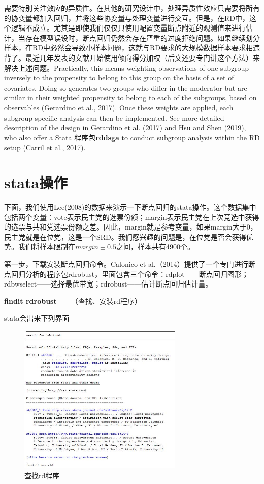 \documentclass[cn,12pt,math=newtx,citestyle=gb7714-2015,bibstyle=gb7714-2015]{elegantbook}
\begin{document}
	需要特别关注效应的异质性。在其他的研究设计中，处理异质性效应只需要将所有的协变量都加入回归，并将这些协变量与处理变量进行交互。但是，在RD中，这个逻辑不成立。尤其是即使我们仅仅只使用配置变量断点附近的观测值来进行估计，当存在模型误设时，断点回归仍然会存在严重的过度拒绝问题。如果继续划分样本，在RD中必然会导致小样本问题，这就与RD要求的大规模数据样本要求相违背了。最近几年发表的文献开始使用倾向得分加权（后文还要专门讲这个方法）来解决上述问题。Practically, this means weighting observations of one subgroup inversely to the propensity to belong to this group on the basis of a set of covariates. Doing so generates two groups who differ in the moderator but are similar in their weighted propensity to belong to each of the subgroups, based on observables (Gerardino et al., 2017). Once these weights are applied, each subgroup-specific analysis can then be implemented. See more detailed description of the design in Gerardino et al. (2017) and Hsu and Shen (2019), who also offer a Stata 程序包\textbf{rddsga} to conduct subgroup analysis within the RD setup (Carril et al., 2017).
	
	

	
	\section{stata操作}
	
	下面，我们使用Lee(2008)的数据来演示一下断点回归的stata操作。这个数据集中包括两个变量：vote表示民主党的选票份额；margin表示民主党在上次竞选中获得的选票与共和党选票份额之差。因此，margin就是参考变量，如果margin大于0，民主党就是在位党，这是一个SRD。我们感兴趣的问题是，在位党是否会获得优势。我们将样本限制在$margin\pm0.5$之间，样本共有4900个。
	
	第一步，下载安装断点回归命令。Calonico et al.（2014）提供了一个专门进行断点回归分析的程序包rdrobust，里面包含三个命令：rdplot——断点回归图形；rdbwselect——选择最优带宽；rdrobust——估计断点回归估计量。
	
	\textbf{findit rdrobust}~~~~（查找、安装rd程序）
	
	stata会出来下列界面
	
	\begin{figure}[htbp]
		\centering
		\includegraphics[width=0.7\textwidth]{findit.jpg}
		\caption{查找rd程序}\label{fig:digit}
	\end{figure}
	
\end{document}
